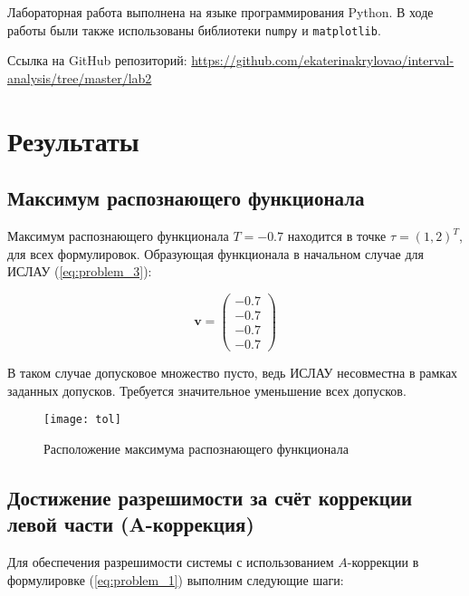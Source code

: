 \documentclass[a4paper,14pt]{article}
\begin{document}
  Лабораторная работа выполнена на языке программирования Python. В ходе
  работы были также использованы библиотеки \verb!numpy! и
  \verb!matplotlib!.

  Ссылка на GitHub репозиторий:
  \url{https://github.com/ekaterinakrylovao/interval-analysis/tree/master/lab2}

  \section{Результаты}

  \subsection{Максимум распознающего функционала}

  Максимум распознающего функционала \( T = -0.7 \) находится в точке
  \( \tau = (1, 2)^T \), для всех формулировок. Образующая функционала в
  начальном случае для ИСЛАУ (\ref{eq:problem_3}):

  \begin{equation}
    \mathbf{v} = \begin{pmatrix}
      -0.7 \\
      -0.7 \\
      -0.7 \\
      -0.7
    \end{pmatrix}
  \end{equation}

  В таком случае допусковое множество пусто, ведь ИСЛАУ несовместна в рамках заданных допусков.
  Требуется значительное уменьшение всех допусков.
    \begin{figure}[H]
        \begin{center}
            \texttt{[image: tol]}
            \caption{Расположение максимума распознающего функционала}
    \label{figure:tol}
        \end{center}
    \end{figure}

    \subsection{Достижение разрешимости за счёт коррекции левой части (A-коррекция)}

    Для обеспечения разрешимости системы с использованием \( A \)-коррекции в формулировке (\ref{eq:problem_1}) выполним следующие шаги:
    
\end{document}
